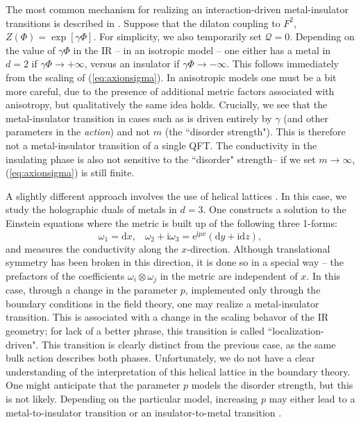 \documentclass[10pt, oneside]{book}
\begin{document}
\begin{doublespace}
The most common mechanism for realizing an interaction-driven metal-insulator transitions is described in \cite{Donos:2014uba, Gouteraux:2014hca}.    Suppose that the dilaton coupling to $F^2$,   $Z(\Phi) = \exp[\gamma \Phi]$.    For simplicity, we also temporarily set $\mathcal{Q}=0$.  Depending on the value of $\gamma \Phi$ in the IR -- in an isotropic model -- one either has a metal in $d=2$  if $\gamma \Phi \rightarrow +\infty$, versus an insulator if $\gamma \Phi \rightarrow -\infty$.   This follows immediately from the scaling of (\ref{eq:axionsigma}).   In anisotropic models one must be a bit more careful, due to the presence of additional metric factors associated with anisotropy,  but qualitatively the same idea  holds.    Crucially, we see that the metal-insulator transition in cases such as \cite{Donos:2014uba, Gouteraux:2014hca} is driven entirely by $\gamma$ (and other parameters in the \emph{action}) and not $m$ (the ``disorder strength").    This is therefore not a metal-insulator transition of a single QFT.   The conductivity in the insulating phase is also not sensitive to the ``disorder" strength-- if we set $m\rightarrow \infty$,  (\ref{eq:axionsigma}) is still finite.

A slightly different approach involves the use of helical lattices \cite{Donos:2012js}.  In this case, we study the holographic duals of metals in $d=3$.   One constructs a solution to the Einstein equations where the metric is built up of the following three 1-forms: \begin{equation}
\omega_1 = \mathrm{d}x, \;\;\; \omega_2 + \mathrm{i}\omega_3 = \mathrm{e}^{\mathrm{i}px}(\mathrm{d}y + \mathrm{i}\mathrm{d}z),
\end{equation}
and measures the conductivity along the $x$-direction.   Although translational symmetry has been broken in this direction, it is done so in a special way -- the prefactors of the coefficients $\omega_i \otimes \omega_j$ in the metric are independent of $x$.   In this case,  through a change in the parameter $p$,  implemented only through the boundary conditions in the field theory,  one may realize a metal-insulator transition.   This is associated with a change in the scaling behavor of the IR geometry;  for lack of a better phrase, this transition is called ``localization-driven".  This transition is clearly distinct from the previous case, as the same bulk action describes both phases.  Unfortunately, we do not have a clear understanding of the interpretation of this helical lattice in the boundary theory.   One might anticipate that the parameter $p$ models the disorder strength, but this is not likely.   Depending on the particular model, increasing $p$ may either lead to a metal-to-insulator transition or an insulator-to-metal transition \cite{Erdmenger:2015qqa}.   


\end{doublespace}
\end{document}
